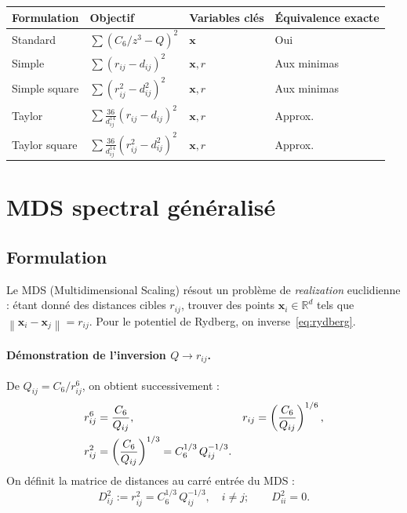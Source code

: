 \documentclass[11pt,a4paper]{article}
\theoremstyle{definition}
\theoremstyle{remark}
\newcommand{\R}{\mathbb{R}}
\newcommand{\norm}[1]{\left\|#1\right\|}
\newcommand{\cSix}{C_6}
\begin{document}
\begin{center}
\small
\begin{tabular}{@{}llll@{}}
  \toprule
  Formulation & Objectif & Variables clés & Équivalence exacte \\
  \midrule
  Standard       & $\sum(\cSix/z^3-Q)^2$        & $\mathbf{x}$           & Oui \\
  Simple         & $\sum(r_{ij}-d_{ij})^2$                 & $\mathbf{x},r$         & Aux minimas \\
  Simple square  & $\sum(r_{ij}^2-d_{ij}^2)^2$            & $\mathbf{x},r$         & Aux minimas \\
  Taylor         & $\sum \tfrac{36}{d_{ij}^{14}}(r_{ij}-d_{ij})^2$ & $\mathbf{x},r$      & Approx. \\
  Taylor square  & $\sum \tfrac{36}{d_{ij}^{14}}(r_{ij}^2-d_{ij}^2)^2$ & $\mathbf{x},r$ & Approx. \\
  \bottomrule
\end{tabular}
\end{center}

\section{MDS spectral généralisé}
\label{sec:mds}

\subsection{Formulation}
\label{sec:mds-formulation}

Le MDS (Multidimensional Scaling) résout un problème de \emph{realization}
euclidienne : étant donné des distances cibles $r_{ij}$, trouver des points
$\mathbf{x}_i \in \R^d$ tels que $\norm{\mathbf{x}_i-\mathbf{x}_j}=r_{ij}$.
Pour le potentiel de Rydberg, on inverse~\eqref{eq:rydberg}.

\paragraph{Démonstration de l'inversion $Q \to r_{ij}$.}
De $Q_{ij}=\cSix/r_{ij}^6$, on obtient successivement :
\begin{align}
  r_{ij}^6 &= \frac{\cSix}{Q_{ij}}, &
  r_{ij} &= \left(\frac{\cSix}{Q_{ij}}\right)^{1/6}, \label{eq:mds-rij}\\
  r_{ij}^2 &= \left(\frac{\cSix}{Q_{ij}}\right)^{1/3}
  = \cSix^{1/3}\,Q_{ij}^{-1/3}. \notag
\end{align}
On définit la matrice de distances au carré entrée du MDS :
\begin{equation}
  D^2_{ij} := r_{ij}^2 = \cSix^{1/3}\,Q_{ij}^{-1/3},
  \quad i \neq j; \qquad D^2_{ii} = 0.
  \label{eq:D2}
\end{equation}
\end{document}

